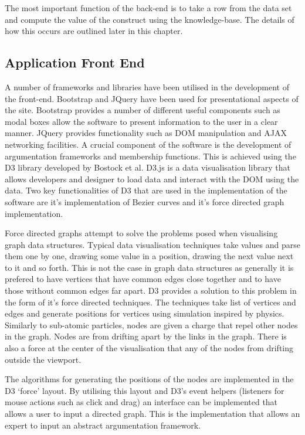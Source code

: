 The most important function of the back-end is to take a row from the data set and compute the value of the construct using the knowledge-base. The details of how this occurs are outlined later in this chapter.

\subsection{Application Front End}

A number of frameworks and libraries have been utilised in the development of the front-end. Bootstrap and JQuery have been used for presentational aspects of the site. Bootstrap provides a number of different useful components such as modal boxes allow the software to present information to the user in a clear manner. JQuery provides functionality such as DOM manipulation and AJAX networking facilities. 
A crucial component of the software is the development of argumentation frameworks and membership functions. This is achieved using the D3 library developed by Bostock et al.\cite{2011-d3} D3.js is a data visualisation library that allows developers and designer to load data and interact with the DOM using the data. Two key functionalities of D3 that are used in the implementation of the software are it's implementation of Bezier curves and it's force directed graph implementation.

Force directed graphs attempt to solve the problems posed when visualising graph data structures. Typical data visualisation techniques take values and parse them one by one, drawing some value in a position, drawing the next value next to it and so forth. This is not the case in graph data structures as generally it is prefered to have vertices that have common edges close together and to have those without common edges far apart. D3 provides a solution to this problem in the form of it's force directed techniques. The techniques take list of vertices and edges and generate positions for vertices using simulation inspired by physics. Similarly to sub-atomic particles, nodes are given a charge that repel other nodes in the graph. Nodes are from drifting apart by the links in the graph. There is also a force at the center of the visualisation that any of the nodes from drifting outside the viewport. 

The algorithms for generating the positions of the nodes are implemented in the D3 `force' layout. By utilising this layout and D3's event helpers (listeners for mouse actions such as click and drag) an interface can be implemented that allows a user to input a directed graph. This is the implementation that allows an expert to input an abstract argumentation framework.

